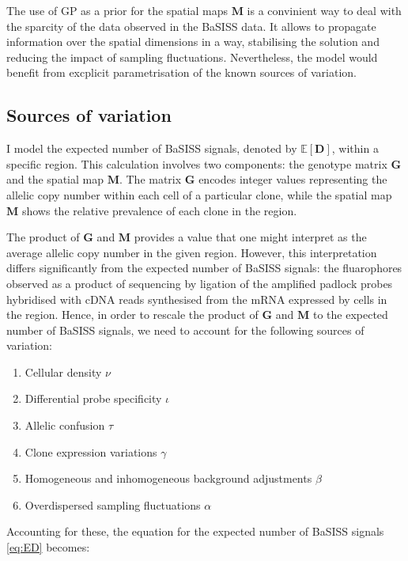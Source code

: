 The use of \ac{GP} as a prior for the spatial maps $\mathbf{M}$ is a convinient way to deal with the sparcity of the data observed in the \ac{BaSISS} data. It allows to propagate information over the spatial dimensions in a  way, stabilising the solution and reducing the impact of sampling fluctuations. Nevertheless, the model would benefit from excplicit parametrisation of the known sources of variation.

\subsection{Sources of variation}

I model the expected number of \ac{BaSISS} signals, denoted by $\mathbb{E}[\mathbf{D}]$, within a specific region. This calculation involves two components: the genotype matrix $\mathbf{G}$ and the spatial map $\mathbf{M}$. The matrix $\mathbf{G}$ encodes integer values representing the allelic copy number within each cell of a particular clone, while the spatial map $\mathbf{M}$ shows the relative prevalence of each clone in the region.

The product of $\mathbf{G}$ and $\mathbf{M}$ provides a value that one might interpret as the average allelic copy number in the given region. However, this interpretation differs significantly from the expected number of BaSISS signals: the fluarophores observed as a product of sequencing by ligation of the amplified padlock probes hybridised with cDNA reads synthesised from the mRNA expressed by cells in the region. Hence, in order to rescale the product of $\mathbf{G}$ and $\mathbf{M}$ to the expected number of BaSISS signals, we need to account for the following sources of variation:

\begin{enumerate}
    \item Cellular density $\nu$
    \item Differential probe specificity $\iota$
    \item Allelic confusion $\tau$
    \item Clone expression variations $\gamma$
    \item Homogeneous and inhomogeneous background adjustments $\beta$
    \item Overdispersed sampling fluctuations $\alpha$
\end{enumerate}

Accounting for these, the equation for the expected number of BaSISS signals \cref{eq:ED} becomes:

